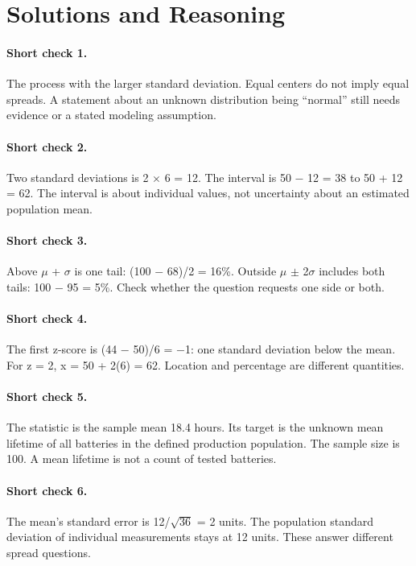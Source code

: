 \documentclass[11pt,letterpaper]{article}
\begin{document}
\clearpage
{\setlength{\parskip}{4pt}
\section*{Solutions and Reasoning}

\paragraph{Short check 1.}
The process with the larger standard deviation. Equal centers do not imply equal spreads. A statement about an unknown distribution being ``normal'' still needs evidence or a stated modeling assumption.


\paragraph{Short check 2.}
Two standard deviations is 2 $\times$ 6 = 12. The interval is 50 $-$ 12 = 38 to 50 + 12 = 62. The interval is about individual values, not uncertainty about an estimated population mean.


\paragraph{Short check 3.}
Above $\mu$ + $\sigma$ is one tail: (100 $-$ 68)/2 = 16\%. Outside $\mu$ $\pm$ 2$\sigma$ includes both tails: 100 $-$ 95 = 5\%. Check whether the question requests one side or both.


\paragraph{Short check 4.}
The first z-score is (44 $-$ 50)/6 = $-$1: one standard deviation below the mean. For z = 2, x = 50 + 2(6) = 62. Location and percentage are different quantities.


\paragraph{Short check 5.}
The statistic is the sample mean 18.4 hours. Its target is the unknown mean lifetime of all batteries in the defined production population. The sample size is 100. A mean lifetime is not a count of tested batteries.


\paragraph{Short check 6.}
The mean's standard error is 12/\(\sqrt{36}\) = 2 units. The population standard deviation of individual measurements stays at 12 units. These answer different spread questions.


}
\end{document}

